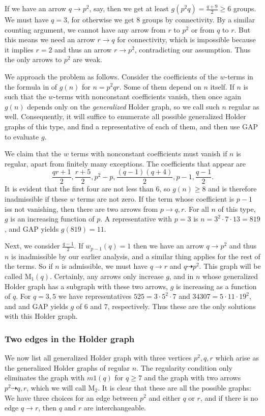 \documentclass[draft]{article}
\newcommand{\m}[1]{\text{M}_{#1}}
\theoremstyle{plain}
\theoremstyle{definition}
\begin{document}
If we have an arrow $q \rightarrow p^2$, say, then we get at least $g(p^2 q) = \frac{q + 9}{2} \ge 6$ groups. We must have $q = 3$, for otherwise we get 8 groups by connectivity. By a similar counting argument, we cannot have any arrow from $r$ to $p^2$ or from $q$ to $r$. But this means we need an arrow $r \rightarrow q$ for connectivity, which is impossible because it implies $r = 2$ and thus an arrow $r \rightarrow p^2$, contradicting our assumption. Thus the only arrows to $p^2$ are weak.

We approach the problem as follows. Consider the coefficients of the $w$-terms in the formula in  of $g(n)$ for $n = p^2 q r$. Some of them depend on $n$ itself. If $n$ is such that the $w$-terms with nonconstant coefficients vanish, then once again $g(n)$ depends only on the \emph{generalized} Holder graph, so we call such $n$ regular as well. Consequently, it will suffice to enumerate all possible generalized Holder graphs of this type, and find a representative of each of them, and then use GAP to evaluate $g$. 

We claim that the $w$ terms with nonconstant coefficients must vanish if $n$ is regular, apart from finitely many exceptions. The coefficients that appear are \[\frac{qr + 1}{2}, \frac{r + 5}{2}, p^2 - p, \frac{(q - 1)(q + 4)}{2}, p - 1, \frac{q - 1}{2}.\] It is evident that the first four are not less than $6$, so $g(n) \ge 8$ and is therefore inadmissible if these $w$ terms are not zero. If the term whose  coefficient is $p - 1$ iss not vanishing, then there are two arrows from $p \rightarrow q, r$. For all $n$ of this type, $g$ is an increasing function of $p$. A representative with $p = 3$ is $n = 3^2 \cdot 7 \cdot 13 = 819$, and GAP yields $g(819) = 11$.

Next, we consider $\frac{q - 1}{2}$.  If $w_{p - 1}(q) = 1$ then we have an arrow $q \rightarrow p^2$ and thus $n$ is inadmissible by our earlier analysis, and a similar thing applies for the rest of the terms. So if $n$ is admissible, we must have $q \rightarrow r$ and $q \dashrightarrow p^2$. This graph will be called $\m{1}(q)$. Certainly, any arrows only increase $g$, and in $n$ whose generalized Holder graph has a subgraph with these two arrows, $g$ is increasing as a function of $q$. For $q = 3, 5$ we have representatives $525 = 3 \cdot 5^2 \cdot 7$ and $34307 = 5 \cdot 11 \cdot 19^2$, and and GAP yields $g$ of $6$ and $7$, respectively. Thus these are the only solutions with this Holder graph.


\subsubsection*{Two edges in the Holder graph}
We now list all generalized Holder graph with three vertices $p^2, q, r$ which arise as the generalized Holder graphs of regular $n$. The regularity condition only eliminates the graph with $m1(q)$ for $q \ge 7$ and the graph with two arrows $p^2 \dashrightarrow q, r$, which we will call $\m2$. It is clear that these are all the possible graphs: We have three choices for an edge between $p^2$ and either $q$ or $r$, and if there is no edge $q \rightarrow r$, then $q$ and $r$ are interchangeable.
\end{document}
